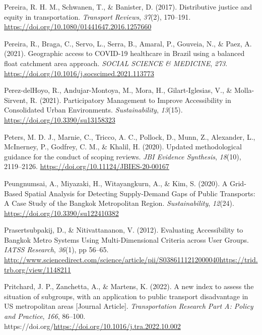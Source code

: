 \documentclass[
  letterpaper,
  DIV=11,
  numbers=noendperiod]{scrartcl}
\newlength{\cslhangindent}
\newenvironment{CSLReferences}[2] %
 {\begin{list}{}{%
  \setlength{\itemindent}{0pt}
  \setlength{\leftmargin}{0pt}
  \setlength{\parsep}{0pt}
  \ifodd #1
   \setlength{\leftmargin}{\cslhangindent}
   \setlength{\itemindent}{-1\cslhangindent}
  \fi
  \setlength{\itemsep}{#2\baselineskip}}}
 {\end{list}}
\begin{document}
\begin{CSLReferences}{1}{0}
Pereira, R. H. M., Schwanen, T., \& Banister, D. (2017). Distributive
justice and equity in transportation. \emph{Transport Reviews},
\emph{37}(2), 170--191.
\url{https://doi.org/10.1080/01441647.2016.1257660}

Pereira, R., Braga, C., Servo, L., Serra, B., Amaral, P., Gouveia, N.,
\& Paez, A. (2021). Geographic access to {COVID-19} healthcare in
{Brazil} using a balanced float catchment area approach. \emph{SOCIAL
SCIENCE \& MEDICINE}, \emph{273}.
\url{https://doi.org/10.1016/j.socscimed.2021.113773}

Perez-delHoyo, R., Andujar-Montoya, M., Mora, H., Gilart-Iglesias, V.,
\& Molla-Sirvent, R. (2021). Participatory {Management} to {Improve
Accessibility} in {Consolidated Urban Environments}.
\emph{Sustainability}, \emph{13}(15).
\url{https://doi.org/10.3390/su13158323}

Peters, M. D. J., Marnie, C., Tricco, A. C., Pollock, D., Munn, Z.,
Alexander, L., McInerney, P., Godfrey, C. M., \& Khalil, H. (2020).
Updated methodological guidance for the conduct of scoping reviews.
\emph{JBI Evidence Synthesis}, \emph{18}(10), 2119--2126.
\url{https://doi.org/10.11124/JBIES-20-00167}

Peungnumsai, A., Miyazaki, H., Witayangkurn, A., \& Kim, S. (2020). A
{Grid-Based Spatial Analysis} for {Detecting Supply-Demand Gaps} of
{Public Transports}: {A Case Study} of the {Bangkok Metropolitan
Region}. \emph{Sustainability}, \emph{12}(24).
\url{https://doi.org/10.3390/su122410382}

Prasertsubpakij, D., \& Nitivattananon, V. (2012). Evaluating
{Accessibility} to {Bangkok Metro Systems Using Multi-Dimensional
Criteria} across {User Groups}. \emph{IATSS Research}, \emph{36}(1), pp
56--65.
\url{http://www.sciencedirect.com/science/article/pii/S0386111212000040https://trid.trb.org/view/1148211}

Pritchard, J. P., Zanchetta, A., \& Martens, K. (2022). A new index to
assess the situation of subgroups, with an application to public
transport disadvantage in US metropolitan areas {[}Journal Article{]}.
\emph{Transportation Research Part A: Policy and Practice}, \emph{166},
86--100. https://doi.org/\url{https://doi.org/10.1016/j.tra.2022.10.002}


\end{CSLReferences}
\end{document}
